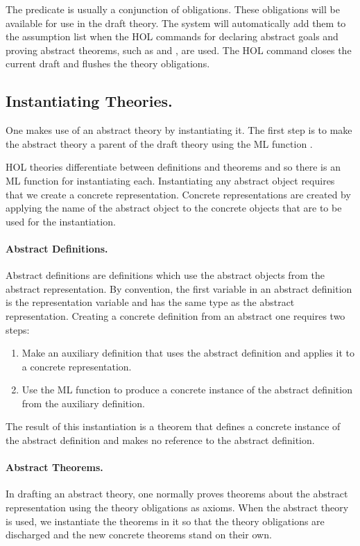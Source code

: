 The predicate is usually a conjunction of obligations.  These obligations
will be available for use in the draft theory.  The system will
automatically add them to the assumption list when the HOL commands for
declaring abstract goals and proving abstract theorems, such as
{} and , are used.  The HOL command
{} closes the current draft and flushes the theory
obligations.

\subsection{Instantiating Theories.}
One makes use of an abstract theory by instantiating it.  The first step is
to make the abstract theory a parent of the draft theory using the ML
function .  

HOL theories differentiate between definitions and theorems and so there
is an ML function for instantiating each.  Instantiating any abstract
object requires that we create a concrete representation.  Concrete
representations are created by applying the name of the abstract object to
the concrete objects that are to be used for the instantiation.  

\paragraph{Abstract Definitions.}
Abstract definitions are definitions which use the abstract objects from
the abstract representation.  By convention, the first variable in an
abstract definition is the representation variable and has the same type as
the abstract representation.  Creating a concrete definition from an
abstract one requires two steps:
\begin{enumerate}
\item
Make an auxiliary definition that uses the abstract definition and applies
it to a concrete representation.
\item
Use the ML function  to produce a
concrete instance of the abstract definition from the auxiliary definition.
\end{enumerate}
The result of this instantiation is a theorem that defines a concrete
instance of the abstract definition and makes no reference to the abstract
definition.

\paragraph{Abstract Theorems.}
In drafting an abstract theory, one normally proves theorems about the
abstract representation using the theory obligations as axioms.  When the
abstract theory is used, we instantiate the theorems in it so that the
theory obligations are discharged and the new concrete theorems stand on
their own.  


